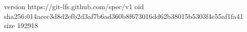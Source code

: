 version https://git-lfs.github.com/spec/v1
oid sha256:014accc3d8d2efb2d3af7b6ad360b8f673016dd62b38015b5303f4e55af1fa41
size 192918
